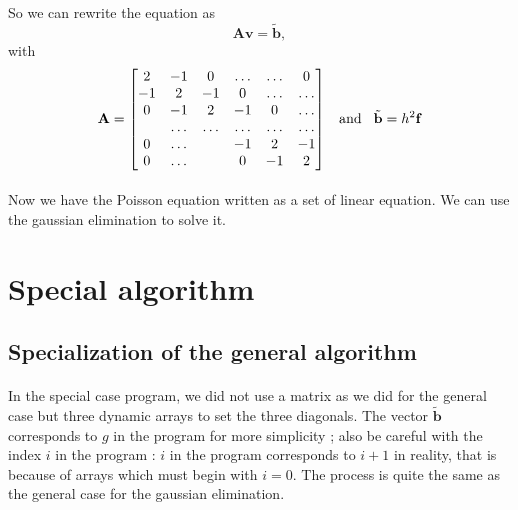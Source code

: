 \documentclass[a4paper, twoside, 11pt]{report}
\theoremstyle{theorem}
\theoremstyle{remark}
\theoremstyle{exemple}
\begin{document}
		So we can rewrite the equation as
		\begin{equation*}
		\mathbf{A}\mathbf{v} = \tilde{\mathbf{b}},
		\end{equation*}
		with 
		\begin{equation*}
		\mathbf{A}  = \begin{bmatrix}
                           2& -1& 0 &\dots   & \dots &0 \\
                           -1 & 2 & -1 &0 &\dots &\dots \\
                           0&-1 &2 & -1 & 0 & \dots \\
                           & \dots   & \dots &\dots   &\dots & \dots \\
                           0&\dots   &  &-1 &2& -1 \\
                           0&\dots    &  & 0  &-1 & 2 \\
                      \end{bmatrix} \hspace{0.3cm} \text{and}\hspace{0.3cm}		\tilde{\mathbf{b}} = h^2\mathbf{f}
		\end{equation*} 
		
		\paragraph{} Now we have the Poisson equation written as a set of linear equation. We can use the gaussian elimination to solve it.
		
		\section{Special algorithm}
			\subsection {Specialization of the general algorithm}
		\paragraph{} In the special case program, we did not use a matrix as we did for the general case but three dynamic arrays to set the three diagonals. The vector $\tilde{\mathbf{b}}$ corresponds to $g$ in the program for more simplicity ; also be careful with the index $i$ in the program : $i$ in the program corresponds to $i+1$ in reality, that is because of arrays which must begin with $i=0$. The process is quite the same as the general case for the gaussian elimination.
		
\end{document}

